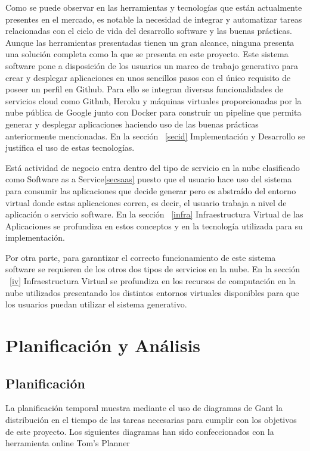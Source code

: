 \documentclass[a4paper,11pt]{book}
\begin{document}
Como se puede observar en las herramientas y tecnologías que están actualmente presentes en el mercado, es notable la necesidad de integrar y automatizar tareas relacionadas con el ciclo de vida del desarrollo software y las buenas prácticas. Aunque las herramientas presentadas tienen un gran alcance, ninguna presenta una solución completa como la que se presenta en este proyecto. Este sistema software pone a disposición de los usuarios un marco de trabajo generativo para crear y desplegar aplicaciones en unos sencillos pasos con el único requisito de poseer un perfil en Github. Para ello se integran diversas funcionalidades de servicios cloud como Github, Heroku y máquinas virtuales proporcionadas por la nube pública de Google  junto con Docker para construir un pipeline que permita generar y desplegar aplicaciones haciendo uso de las buenas prácticas anteriormente mencionadas. En la sección ~\ref{secid} Implementación y Desarrollo se justifica el uso de estas tecnologías. 

Está actividad de negocio entra dentro del tipo de servicio en la nube clasificado como Software as a Service\ref{secsaas} puesto que el usuario hace uso del sistema para consumir las aplicaciones que decide generar pero es abstraído del entorno virtual donde estas aplicaciones corren, es decir, el usuario trabaja a nivel de aplicación o servicio software. En la sección ~\ref{infra}  Infraestructura Virtual de las Aplicaciones se profundiza en estos conceptos y en la tecnología utilizada para su implementación. 

Por otra parte, para garantizar el correcto funcionamiento de este sistema software se requieren de los otros dos tipos de servicios en la nube. En la sección ~\ref{iv} Infraestructura Virtual se profundiza en los recursos de computación en la nube utilizados presentando los distintos entornos virtuales disponibles para que los usuarios puedan utilizar el sistema generativo.


\chapter{Planificación y Análisis}

\section{Planificación}

La planificación temporal muestra mediante el uso de diagramas de Gant la distribución en el tiempo de las tareas necesarias para cumplir con los objetivos de este proyecto. Los siguientes diagramas han sido confeccionados con la herramienta online Tom's Planner\cite{tom}
\end{document}
